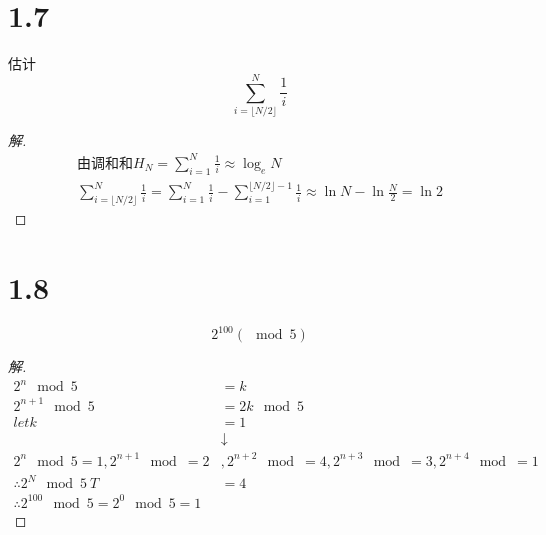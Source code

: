 \documentclass[utf8]{ctexart}
\begin{document}
\section*{1.7}
估计
\[\sum_{i=\lfloor N/2\rfloor}^{N}\frac 1i\]
\begin{proof}[解]
\begin{align*}
\text{由调和和}H_N = \sum_{i=1}^{N} \frac 1i \approx \log _e N\\ 
\sum_{i=\lfloor N/2\rfloor}^{N}\frac 1i = \sum_{i=1}^{N} \frac 1i - \sum_{i=1}^{\lfloor N/2\rfloor -1} \frac 1i\approx \ln N - \ln \frac N 2 = \ln 2
\end{align*}
\end{proof}
\section*{1.8}
\[2^{100}(\mod 5)\]

\begin{proof}[解]
\begin{align*}
2^n \mod 5 & = k\\
2^{n+1}\mod 5 & = 2k\mod 5\\
let k &= 1\\
&\downarrow\\
2^n\mod 5 =1, 2^{n+1}\mod = 2&,2^{n+2}\mod = 4,2^{n+3}\mod=3,2^{n+4}\mod =1\\
\therefore 2^N\mod 5\ T &= 4\\
\therefore 2^100 \mod 5 = 2^0\mod 5 =1
\end{align*}
\end{proof}
\end{document}
